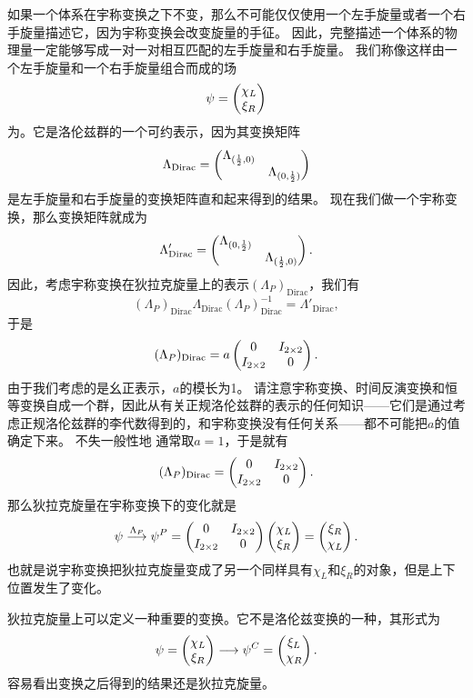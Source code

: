 如果一个体系在宇称变换之下不变，那么不可能仅仅使用一个左手旋量或者一个右手旋量描述它，因为宇称变换会改变旋量的手征。
因此，完整描述一个体系的物理量一定能够写成一对一对相互匹配的左手旋量和右手旋量。
我们称像这样由一个左手旋量和一个右手旋量组合而成的场
\begin{equation}
    \psi = \pmqty{\chi_L \\ \xi_R}
\end{equation}
为。它是洛伦兹群的一个可约表示，因为其变换矩阵
\begin{equation}
    \Lambda_\text{Dirac} = \pmqty{\dmat{\Lambda_{(\frac{1}{2}, 0)}, \Lambda_{(0, \frac{1}{2})}}}
\end{equation}
是左手旋量和右手旋量的变换矩阵直和起来得到的结果。
现在我们做一个宇称变换，那么变换矩阵就成为
\[
    \Lambda'_\text{Dirac} = \pmqty{\dmat{\Lambda_{(0, \frac{1}{2})}, \Lambda_{(\frac{1}{2}, 0)}}}.
\]
因此，考虑宇称变换在狄拉克旋量上的表示$(\Lambda_P)_\text{Dirac}$，我们有
\[
    (\Lambda_P)_\text{Dirac} \Lambda_\text{Dirac} (\Lambda_P)_\text{Dirac}^{-1} = \Lambda'_\text{Dirac},
\]
于是
\[
    (\Lambda_P)_\text{Dirac} = a \pmqty{0 & I_{2\times 2} \\ I_{2 \times 2} & 0}.
\]
由于我们考虑的是幺正表示，$a$的模长为1。
请注意宇称变换、时间反演变换和恒等变换自成一个群，因此从有关正规洛伦兹群的表示的任何知识——它们是通过考虑正规洛伦兹群的李代数得到的，和宇称变换没有任何关系——都不可能把$a$的值确定下来。
不失一般性地%
通常取$a=1$，于是就有
\begin{equation}
    (\Lambda_P)_\text{Dirac} = \pmqty{0 & I_{2\times 2} \\ I_{2 \times 2} & 0}.
\end{equation}
那么狄拉克旋量在宇称变换下的变化就是
\begin{equation}
    \psi \stackrel{\Lambda_P}{\longrightarrow} \psi^P = \pmqty{0 & I_{2\times 2} \\ I_{2 \times 2} & 0} \pmqty{\chi_L \\ \xi_R} = \pmqty{\xi_R \\ \chi_L}.
\end{equation}
也就是说宇称变换把狄拉克旋量变成了另一个同样具有$\chi_L$和$\xi_R$的对象，但是上下位置发生了变化。

狄拉克旋量上可以定义一种重要的变换。它不是洛伦兹变换的一种，其形式为
\begin{equation}
    \psi = \pmqty{\chi_L \\ \xi_R} \longrightarrow \psi^C = \pmqty{\xi_L \\ \chi_R}.
\end{equation}
容易看出变换之后得到的结果还是狄拉克旋量。

